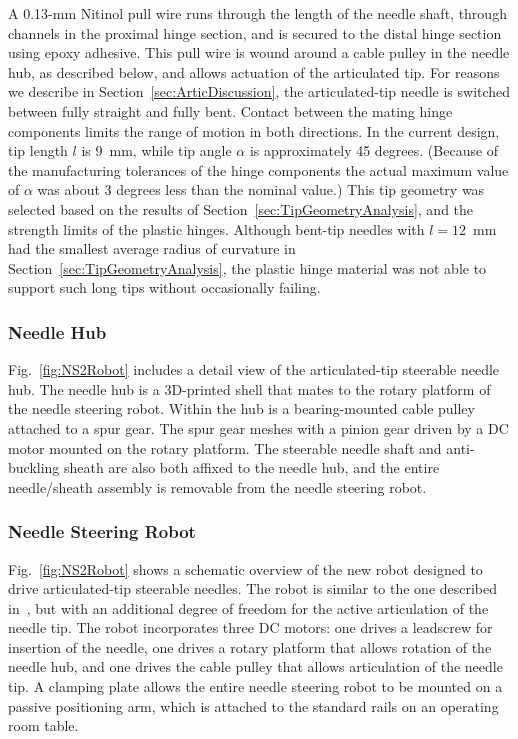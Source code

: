 A 0.13-mm Nitinol pull wire runs through the length of the needle shaft, through channels in the proximal hinge section, and is secured to the distal hinge section using epoxy adhesive. This pull wire is wound around a cable pulley in the needle hub, as described below, and allows actuation of the articulated tip. For reasons we describe in Section~\ref{sec:ArticDiscussion}, the articulated-tip needle is switched between fully straight and fully bent. Contact between the mating hinge components limits the range of motion in both directions. In the current design, tip length $l$ is 9~mm, while tip angle $\alpha$ is approximately 45 degrees. (Because of the manufacturing tolerances of the hinge components the actual maximum value of $\alpha$ was about 3 degrees less than the nominal value.) This tip geometry was selected based on the results of Section~\ref{sec:TipGeometryAnalysis}, and the strength limits of the plastic hinges. Although bent-tip needles with $l = 12$~mm had the smallest average radius of curvature in Section~\ref{sec:TipGeometryAnalysis}, the plastic hinge material was not able to support such long tips without occasionally failing.

\subsubsection{Needle Hub}
Fig.~\ref{fig:NS2Robot} includes a detail view of the articulated-tip steerable needle hub. The needle hub is a 3D-printed shell that mates to the rotary platform of the needle steering robot. Within the hub is a bearing-mounted cable pulley attached to a spur gear. The spur gear meshes with a pinion gear driven by a DC motor mounted on the rotary platform. The steerable needle shaft and anti-buckling sheath are also both affixed to the needle hub, and the entire needle/sheath assembly is removable from the needle steering robot.

\subsubsection{Needle Steering Robot}
Fig.~\ref{fig:NS2Robot} shows a schematic overview of the new robot designed to drive articulated-tip steerable needles. The robot is similar to the one described in~\cite{Majewicz2012}, but with an additional degree of freedom for the active articulation of the needle tip. The robot incorporates three DC motors: one drives a leadscrew for insertion of the needle, one drives a rotary platform that allows rotation of the needle hub, and one drives the cable pulley that allows articulation of the needle tip. A clamping plate allows the entire needle steering robot to be mounted on a passive positioning arm, which is attached to the standard rails on an operating room table. 

